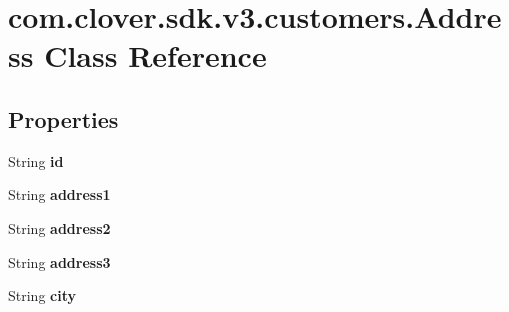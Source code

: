 \hypertarget{classcom_1_1clover_1_1sdk_1_1v3_1_1customers_1_1_address}{}\section{com.\+clover.\+sdk.\+v3.\+customers.\+Address Class Reference}
\label{classcom_1_1clover_1_1sdk_1_1v3_1_1customers_1_1_address}
\subsection*{Properties}
\begin{DoxyCompactItemize}
\item 
\mbox{\label{classcom_1_1clover_1_1sdk_1_1v3_1_1customers_1_1_address_a352fc2a275002b7be701394b061463df}} 
String {\bfseries id}
\item 
\mbox{\label{classcom_1_1clover_1_1sdk_1_1v3_1_1customers_1_1_address_a866e0e686202aa894ed81871cf791489}} 
String {\bfseries address1}
\item 
\mbox{\label{classcom_1_1clover_1_1sdk_1_1v3_1_1customers_1_1_address_aa180e104ea7d2b3f358e69e55b649fa6}} 
String {\bfseries address2}
\item 
\mbox{\label{classcom_1_1clover_1_1sdk_1_1v3_1_1customers_1_1_address_a43d80dd5f9157a717d2dd8167f6b9cbf}} 
String {\bfseries address3}
\item 
\mbox{\label{classcom_1_1clover_1_1sdk_1_1v3_1_1customers_1_1_address_adee08f67e3a02a18ee7ad3d9b457c072}} 
String {\bfseries city}
\item 

\end{DoxyCompactItemize}
